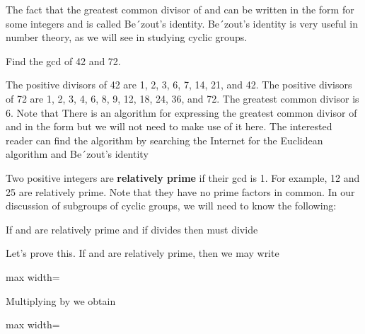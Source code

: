 \documentclass[11pt,oneside]{article}
\begin{document}
\begin{BookBody}

The fact that the greatest common divisor  of  and  can be written in the form  for some integers  and  is called Be´zout’s identity. Be´zout’s identity is very useful in number theory, as we will see in studying cyclic groups.

 Find the gcd of 42 and 72.

 The positive divisors of 42 are 1, 2, 3, 6, 7, 14, 21, and 42. The positive divisors of 72 are 1, 2, 3, 4, 6, 8, 9, 12, 18, 24, 36, and 72. The greatest common divisor is 6. Note that  There is an algorithm for expressing the greatest common divisor  of  and  in the form  but we will not need to make use of it here. The interested reader can find the algorithm by searching the Internet for the Euclidean algorithm and Be´zout’s identity\BookEnd{\blacktriangle}

Two positive integers are\textbf{ relatively prime} if their gcd is 1. For example, 12 and 25 are relatively prime. Note that they have no prime factors in common. In our discussion of subgroups of cyclic groups, we will need to know the following:

If  and  are relatively prime and if  divides  then  must divide 

\noindent Let’s prove this. If  and  are relatively prime, then we may write

\begin{center}\begin{adjustbox}{max width=\linewidth}\end{adjustbox}\end{center}

\noindent Multiplying by  we obtain

\begin{center}\begin{adjustbox}{max width=\linewidth}\end{adjustbox}\end{center}


\end{BookBody}
\end{document}
